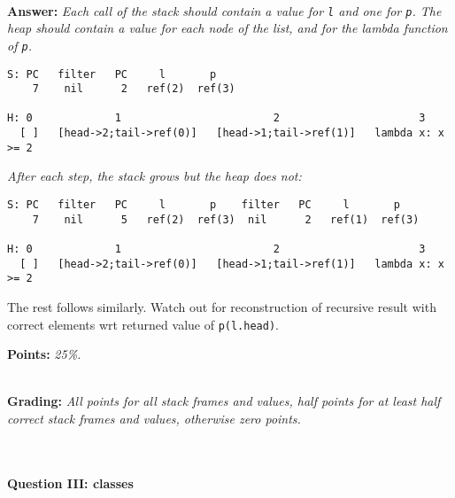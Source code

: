 \ \\ 

\textbf{Answer:} \textit{Each call of the stack should contain a value for \texttt{l} and one for \texttt{p}. The heap should contain a value for each node of the list, and for the lambda function of \texttt{p}.}

\begin{lstlisting}
S: PC   filter   PC     l       p
    7    nil      2   ref(2)  ref(3)
    
H: 0             1                        2                      3
  [ ]   [head->2;tail->ref(0)]   [head->1;tail->ref(1)]   lambda x: x >= 2
\end{lstlisting}

\textit{After each step, the stack grows but the heap does not:}

\begin{lstlisting}
S: PC   filter   PC     l       p    filter   PC     l       p
    7    nil      5   ref(2)  ref(3)  nil      2   ref(1)  ref(3)
    
H: 0             1                        2                      3
  [ ]   [head->2;tail->ref(0)]   [head->1;tail->ref(1)]   lambda x: x >= 2
\end{lstlisting}

The rest follows similarly. Watch out for reconstruction of recursive result with correct elements wrt returned value of \texttt{p(l.head)}.

\textbf{Points:} \textit{25\%.}

\ \\ 

\textbf{Grading:} \textit{All points for all stack frames and values, half points for at least half correct stack frames and values, otherwise zero points.}

\ \\ 

\paragraph{Question III: classes} \ \\

